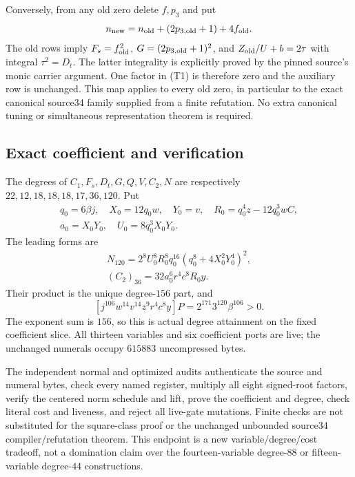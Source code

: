 \documentclass[11pt]{article}
\begin{document}
Conversely, from any old zero delete $f,p_3$ and put
\[
 n_{\rm new}=n_{\rm old}+(2p_{3,\rm old}+1)+4f_{\rm old}.
\]
The old rows imply $F_s=f_{\rm old}^2$, $G=(2p_{3,\rm old}+1)^2$, and
$Z_{\rm old}/U+b=2\tau$ with integral $\tau^2=D_t$. The latter integrality is
explicitly proved by the pinned source's monic carrier argument. One factor in
(T1) is therefore zero and the auxiliary row is unchanged. This map applies to
every old zero, in particular to the exact canonical source34 family supplied
from a finite refutation. No extra canonical tuning or simultaneous
representation theorem is required.

\subsection{Exact coefficient and verification}
The degrees of $C_1,F_s,D_t,G,Q,V,C_2,N$ are respectively
$22,12,18,18,18,17,36,120$. Put
\begin{gather*}
 q_0=6\beta j,\quad X_0=12q_0w,\quad Y_0=v,\quad
 R_0=q_0^4z-12q_0^3wC,\\
 a_0=X_0Y_0,\quad U_0=8q_0^3X_0Y_0.
\end{gather*}
The leading forms are
\begin{gather*}
 N_{120}=2^8U_0^8R_0^8q_0^{16}(q_0^8+4X_0^2Y_0^4)^2,\\
 (C_2)_{36}=32a_0^6r^4c^8R_0y.
\end{gather*}
Their product is the unique degree-$156$ part, and
\[
 [j^{106}w^{14}v^{14}z^9r^4c^8y]P
       =2^{171}3^{120}\beta^{106}>0.
\]
The exponent sum is $156$, so this is actual degree attainment on the fixed
coefficient slice. All thirteen variables and six coefficient ports are live;
the unchanged numerals occupy $615883$ uncompressed bytes.

The independent normal and optimized audits authenticate the source and numeral
bytes, check every named register, multiply all eight signed-root factors,
verify the centered norm schedule and lift, prove the coefficient and degree,
check literal cost and liveness, and reject all live-gate mutations. Finite
checks are not substituted for the square-class proof or the unchanged
unbounded source34 compiler/refutation theorem. This endpoint is a new
variable/degree/cost tradeoff, not a domination claim over the fourteen-variable
degree-$88$ or fifteen-variable degree-$44$ constructions.
\end{document}
